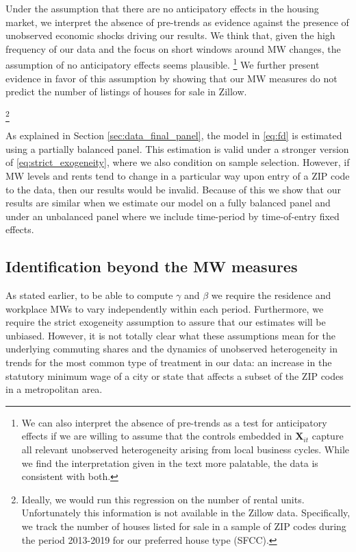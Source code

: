 Under the assumption that there are no anticipatory effects in the housing 
market, we interpret the absence of pre-trends as evidence against the presence 
of unobserved economic shocks driving our results.
We think that, given the high frequency of our data and the focus on short 
windows around MW changes, the assumption of no anticipatory effects seems 
plausible.%
\footnote{We can also interpret the absence of pre-trends as a test for 
anticipatory effects if we are willing to assume that the controls embedded in 
$\mathbf{X}_{it}$ capture all relevant unobserved heterogeneity arising from 
local business cycles.
While we find the interpretation given in the text more palatable, the data is 
consistent with both.}
We further present evidence in favor of this assumption by showing that our MW 
measures do not predict the number of listings of houses for sale in Zillow.%

\footnote{Ideally, we would run this regression on the number of rental units.
Unfortunately this information is not available in the Zillow data.
Specifically, we track the number of houses listed for sale in a sample of ZIP 
codes during the period 2013-2019 for our preferred house type (SFCC).}

As explained in Section \ref{sec:data_final_panel}, 
the model in \eqref{eq:fd} is estimated using a partially balanced panel.
This estimation is valid under a stronger version of 
\eqref{eq:strict_exogeneity}, where we also condition on sample selection.
However, if MW levels and rents tend to change in a particular way upon entry 
of a ZIP code to the data, then our results would be invalid.
Because of this we show that our results are similar when we estimate our model
on a fully balanced panel and under an unbalanced panel where we include 
time-period by time-of-entry fixed effects.

\subsection{Identification beyond the MW measures}

As stated earlier, to be able to compute $\gamma$ and $\beta$ we require the 
residence and workplace MWs to vary independently within each period.
Furthermore, we require the strict exogeneity assumption to assure that our
estimates will be unbiased.
However, it is not totally clear what these assumptions mean for the underlying 
commuting shares and the dynamics of unobserved heterogeneity in trends for the 
most common type of treatment in our data: 
an increase in the statutory minimum wage of a city or state that affects 
a subset of the ZIP codes in a metropolitan area.

